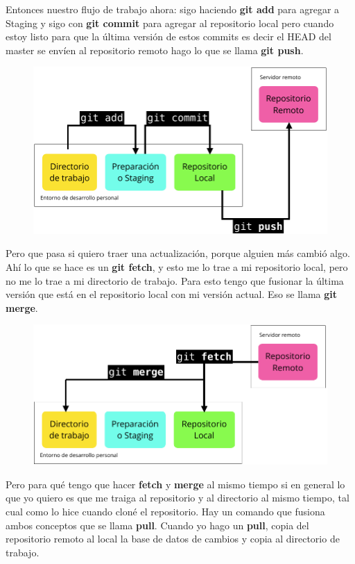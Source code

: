 \documentclass{article}
\begin{document}
Entonces nuestro flujo de trabajo ahora: sigo haciendo \textbf{git add} para
agregar a Staging y sigo con \textbf{git commit} para agregar al repositorio
local pero cuando estoy listo para que la última versión de estos commits es
decir el HEAD del master se envíen al repositorio remoto hago lo que se llama
\textbf{git push}.

\begin{figure}[h!]
  \centering
  \includegraphics[scale=0.6]{./Pictures/124_new_flujo.png}
\end{figure}

Pero que pasa si quiero traer una actualización, porque alguien más cambió
algo. Ahí lo que se hace es un \textbf{git fetch}, y esto me lo trae a mi
repositorio local, pero no me lo trae a mi directorio de trabajo. Para esto
tengo que fusionar la última versión que está en el repositorio local con mi
versión actual. Eso se llama \textbf{git merge}.

\begin{figure}[h!]
  \centering
  \includegraphics[scale=0.6]{./Pictures/125_fetch_merge.png}
\end{figure}

Pero para qué tengo que hacer \textbf{fetch} y \textbf{merge} al mismo tiempo
si en general lo que yo quiero es que me traiga al repositorio y al directorio
al mismo tiempo, tal cual como lo hice cuando cloné el repositorio. Hay un
comando que fusiona ambos conceptos que se llama \textbf{pull}. Cuando yo hago
un \textbf{pull}, copia del repositorio remoto al local la base de datos de
cambios y copia al directorio de trabajo.
\end{document}

